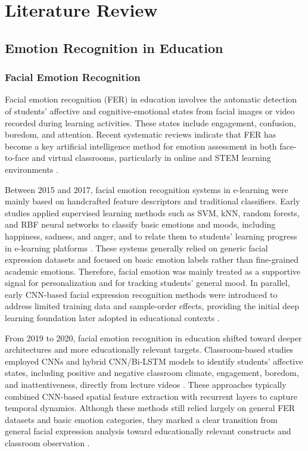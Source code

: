 \chapter{Literature Review}\label{chap:background}


\section{Emotion Recognition in Education}


\subsection{Facial Emotion Recognition}
Facial emotion recognition (FER) in education involves the automatic detection of students’ affective and cognitive-emotional states from facial images or video recorded during learning activities. These states include engagement, confusion, boredom, and attention. Recent systematic reviews indicate that FER has become a key artificial intelligence method for emotion assessment in both face-to-face and virtual classrooms, particularly in online and STEM learning environments \cite{anwar2023emotions,vistorte2024integrating}.

Between 2015 and 2017, facial emotion recognition systems in e-learning were mainly based on handcrafted feature descriptors and traditional classifiers. Early studies applied supervised learning methods such as SVM, kNN, random forests, and RBF neural networks to classify basic emotions and moods, including happiness, sadness, and anger, and to relate them to students’ learning progress in e-learning platforms \cite{ayvaz2017facial,ashwin2015elearning,alalwani2016mood}. These systems generally relied on generic facial expression datasets and focused on basic emotion labels rather than fine-grained academic emotions. Therefore, facial emotion was mainly treated as a supportive signal for personalization and for tracking students’ general mood. In parallel, early CNN-based facial expression recognition methods were introduced to address limited training data and sample-order effects, providing the initial deep learning foundation later adopted in educational contexts \cite{lopes2017facial}.

From 2019 to 2020, facial emotion recognition in education shifted toward deeper architectures and more educationally relevant targets. Classroom-based studies employed CNNs and hybrid CNN/Bi-LSTM models to identify students’ affective states, including positive and negative classroom climate, engagement, boredom, and inattentiveness, directly from lecture videos \cite{ramakrishnan2019toward,ashwin2020automatic}. These approaches typically combined CNN-based spatial feature extraction with recurrent layers to capture temporal dynamics. Although these methods still relied largely on general FER datasets and basic emotion categories, they marked a clear transition from general facial expression analysis toward educationally relevant constructs and classroom observation \cite{anwar2023emotions}.


